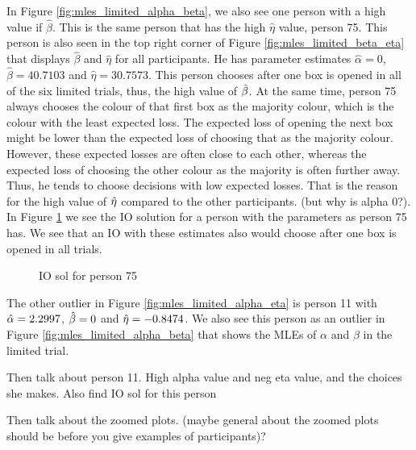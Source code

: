 In Figure \ref{fig:mles_limited_alpha_beta}, we also see one person with a high value if $\hat{\beta}$. This is the same person that has the high $\hat{\eta}$ value, person 75. This person is also seen in the top right corner of Figure \ref{fig:mles_limited_beta_eta} that displays $\hat{\beta}$ and $\hat{\eta}$ for all participants. He has parameter estimates $\hat{\alpha}=0$, $\hat{\beta}=40.7103$ and $\hat{\eta}=30.7573$. This person chooses after one box is opened in all of the six limited trials, thus, the high value of $\hat{\beta}$. At the same time, person 75 always chooses the colour of that first box as the majority colour, which is the colour with the least expected loss. The expected loss of opening the next box might be lower than the expected loss of choosing that as the majority colour. However, these expected losses are often close to each other, whereas the expected loss of choosing the other colour as the majority is often further away. Thus, he tends to choose decisions with low expected losses. That is the reason for the high value of $\hat{\eta}$ compared to the other participants. (but why is alpha 0?). In Figure \ref{fig:IO_sol_person_75_lim} we see the IO solution for a person with the parameters as person 75 has. We see that an IO with these estimates also would choose after one box is opened in all trials. 
\begin{figure}
    \centering
    \scalebox{0.8}{}
    \caption[IO solution for person 75, limited]{IO sol for person 75}
    \label{fig:IO_sol_person_75_lim}
\end{figure}

The other outlier in Figure \ref{fig:mles_limited_alpha_eta} is person 11 with $\hat{\alpha}=2.2997$, $\hat{\beta}=0$ and $\hat{\eta}=-0.8474$. We also see this person as an outlier in Figure \ref{fig:mles_limited_alpha_beta} that shows the MLEs of $\alpha$ and $\beta$ in the limited trial. 

Then talk about person 11. High alpha value and neg eta value, and the choices she makes.
Also find IO sol for this person

Then talk about the zoomed plots. (maybe general about the zoomed plots should be before you give examples of participants)?



